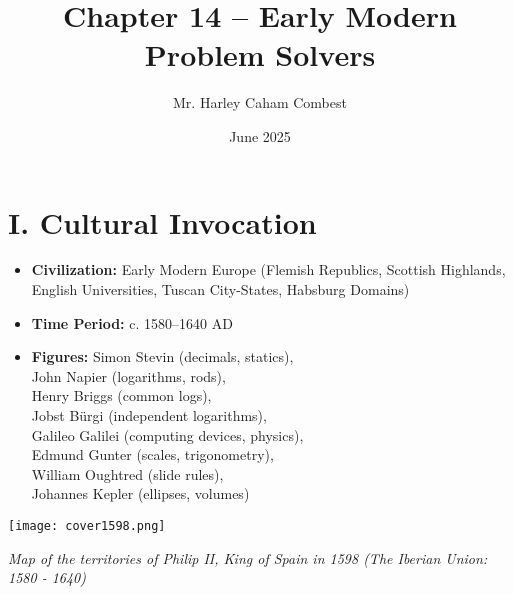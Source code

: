 \documentclass[9pt]{article}
\title{Chapter 14 -- Early Modern Problem Solvers}
\author{Mr. Harley Caham Combest}
\date{June 2025}
\begin{document}
\maketitle

\section*{I. Cultural Invocation}

\begin{itemize}
    \item \textbf{Civilization:} Early Modern Europe (Flemish Republics, Scottish Highlands, English Universities, Tuscan City-States, Habsburg Domains)
    \item \textbf{Time Period:} c. 1580–1640 AD
    \item \textbf{Figures:} 
    Simon Stevin (decimals, statics), \\
    John Napier (logarithms, rods), \\
    Henry Briggs (common logs), \\
    Jobst Bürgi (independent logarithms), \\
    Galileo Galilei (computing devices, physics), \\
    Edmund Gunter (scales, trigonometry), \\
    William Oughtred (slide rules), \\
    Johannes Kepler (ellipses, volumes)
\end{itemize}


\begin{center}
    \texttt{[image: cover1598.png]}
    
    \textit{Map of the territories of Philip II, King of Spain in 1598 (The Iberian Union: 1580 - 1640)}
\end{center}

\vspace{1em}
\end{document}
